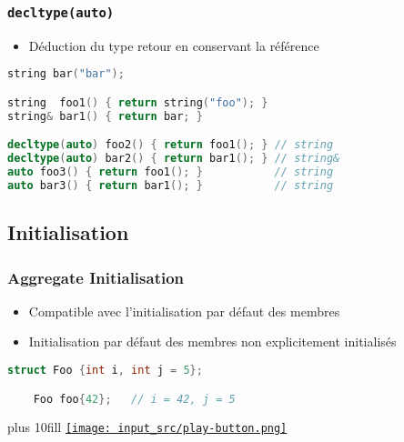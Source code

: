\documentclass[C++.tex]{subfiles}
\begin{document}
\begin{frame}[fragile]
	\frametitle{\lstinline|decltype(auto)|}
	\begin{itemize}
		\item Déduction du type retour en conservant la référence
	\end{itemize}

	\begin{lstlisting}[language=C++]
string bar("bar");

string  foo1() { return string("foo"); }
string& bar1() { return bar; }

decltype(auto) foo2() { return foo1(); } // string
decltype(auto) bar2() { return bar1(); } // string&
auto foo3() { return foo1(); }           // string
auto bar3() { return bar1(); }           // string\end{lstlisting}
\end{frame}

\subsection*{Initialisation}
\begin{frame}[fragile]
	\frametitle{Aggregate Initialisation}
	\begin{itemize}
		\item Compatible avec l'initialisation par défaut des membres
		\item Initialisation par défaut des membres non explicitement initialisés
	\end{itemize}

	\begin{lstlisting}[language=C++]
	struct Foo {int i, int j = 5};

	Foo foo{42};   // i = 42, j = 5\end{lstlisting}

	\vskip 10mm plus 10fill
	\hfill
	\href{https://godbolt.org/#g:!((g:!((g:!((h:codeEditor,i:(filename:'1',fontScale:14,fontUsePx:'0',j:1,lang:c%2B%2B,selection:(endColumn:1,endLineNumber:23,positionColumn:1,positionLineNumber:23,selectionStartColumn:1,selectionStartLineNumber:1,startColumn:1,startLineNumber:1),source:'%23include+%3Ciostream%3E%0A%0Astruct+Foo%0A%7B%0A++int+a%3B%0A++int+b+%3D+42%3B%0A%7D%3B%0A%0Aint+main()%0A%7B%0A++%7B%0A++++Foo+foo%7B6%7D%3B%0A%0A++++std::cout+%3C%3C+foo.a+%3C%3C+!'+!'+%3C%3C+foo.b+%3C%3C+!'%5Cn!'%3B%0A++%7D%0A%0A++%7B%0A++++Foo+foo%7B6,+5%7D%3B%0A%0A++++std::cout+%3C%3C+foo.a+%3C%3C+!'+!'+%3C%3C+foo.b+%3C%3C+!'%5Cn!'%3B%0A++%7D%0A%7D%0A'),l:'5',n:'0',o:'C%2B%2B+source+%231',t:'0')),k:50,l:'4',n:'0',o:'',s:0,t:'0'),(g:!((h:executor,i:(argsPanelShown:'1',compilationPanelShown:'0',compiler:g122,compilerName:'',compilerOutShown:'0',execArgs:'',execStdin:'',fontScale:14,fontUsePx:'0',j:1,lang:c%2B%2B,libs:!((name:boost,ver:'175')),options:'-std%3Dc%2B%2B14+-Wall+-Wextra',source:1,stdinPanelShown:'1',tree:'1',wrap:'0'),l:'5',n:'0',o:'Executor+x86-64+gcc+12.2+(C%2B%2B,+Editor+%231)',t:'0')),header:(),k:50,l:'4',n:'0',o:'',s:0,t:'0')),l:'2',n:'0',o:'',t:'0')),version:4}{\texttt{[image: input\_src/play-button.png]}}
\end{frame}
\end{document}
